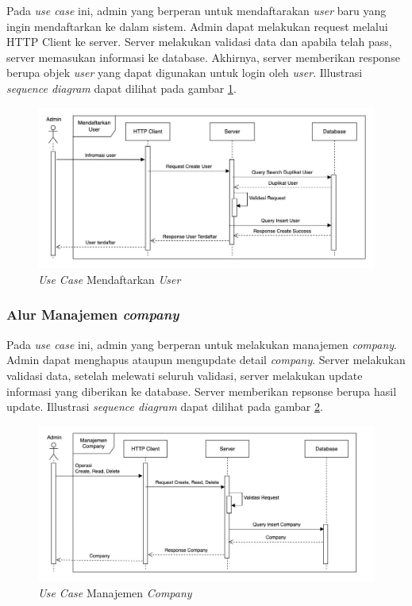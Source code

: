 Pada \textit{use case} ini, admin yang berperan untuk mendaftarakan \textit{user} baru yang ingin mendaftarkan ke dalam sistem. Admin dapat melakukan request melalui HTTP Client ke server. Server melakukan validasi data dan apabila telah pass, server memasukan informasi ke database. Akhirnya, server memberikan response berupa objek \textit{user} yang dapat digunakan untuk login oleh \textit{user}. Illustrasi \textit{sequence diagram} dapat dilihat pada gambar \ref{fig:usecase-02}.

\begin{figure}[ht]
  \centering
  \includegraphics[width=1\textwidth]{resources/chapter-3/usecase/uc-02.jpg}
  \caption{\textit{Use Case} Mendaftarkan \textit{User}}
  \label{fig:usecase-02}
\end{figure}

\subsubsection{Alur Manajemen \textit{company}}

Pada \textit{use case} ini, admin yang berperan untuk melakukan manajemen \textit{company}. Admin dapat menghapus ataupun mengupdate detail \textit{company}. Server melakukan validasi data, setelah melewati seluruh validasi, server melakukan update informasi yang diberikan ke database. Server memberikan repsonse berupa hasil update. Illustrasi \textit{sequence diagram} dapat dilihat pada gambar \ref{fig:usecase-03}.

\begin{figure}[ht]
  \centering
  \includegraphics[width=1\textwidth]{resources/chapter-3/usecase/uc-03.jpg}
  \caption{\textit{Use Case} Manajemen \textit{Company}}
  \label{fig:usecase-03}
\end{figure}

